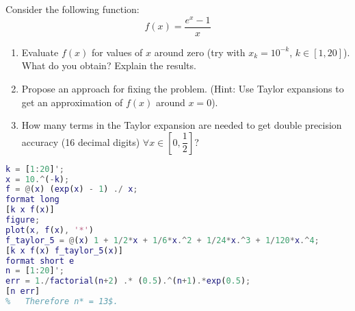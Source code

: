 \documentclass[12pt, a4paper]{report}
\newtheorem[style=M,bodystyle=\normalfont]{theorem}{Theorem}
\newtheorem[style=M,bodystyle=\normalfont]{corollary}{Corollary}
\newtheorem[style=M,bodystyle=\normalfont]{lemma}{Lemma}
\newtheorem[style=M,bodystyle=\normalfont]{definition}{Definition}
\begin{document}
    \newpage

    \begin{Exercise}[label=5]
        Consider the following function:
        \[f(x)=\dfrac{e^x-1}{x}\]
        \begin{enumerate}
            \item Evaluate $f(x)$ for values of $x$ around zero (try with $x_k = 10^{-k}$, $k \in [1, 20]$). What do you obtain? Explain the results.
            \item Propose an approach for fixing the problem. (Hint: Use Taylor expansions to get an approximation of $f(x)$ around $x = 0$). 
            \item How many terms in the Taylor expansion are needed to get double precision accuracy (16 decimal digits) $\forall x \in \left[0, \dfrac{1}{2}\right]$?
        \end{enumerate}
    \end{Exercise}
    \begin{Answer}[ref=5]
        \begin{lstlisting}[language=Matlab]
%   Evaluate f(x) for values of x around zero (try with xk = 10^{-k}, k in [1,20]). What do you obtain? Explain the results.
k = [1:20]';
x = 10.^(-k);
f = @(x) (exp(x) - 1) ./ x;
format long
[k x f(x)]
figure;
plot(x, f(x), '*')
f_taylor_5 = @(x) 1 + 1/2*x + 1/6*x.^2 + 1/24*x.^3 + 1/120*x.^4;
[k x f(x) f_taylor_5(x)]
format short e
n = [1:20]';
err = 1./factorial(n+2) .* (0.5).^(n+1).*exp(0.5);
[n err]
%   Therefore n* = 13$.            
        \end{lstlisting}
    \end{Answer}

    \newpage
\end{document}
